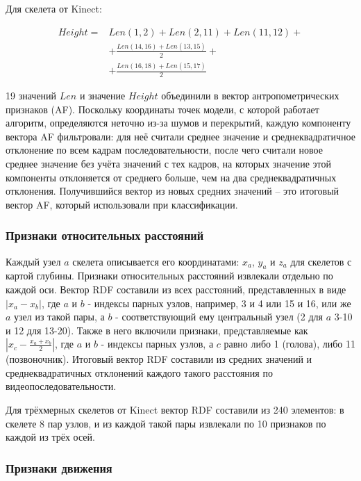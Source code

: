 \documentclass[a4paper,twoside,11pt]{article}
\numberwithin{equation}{section}
\begin{document}
Для скелета от Kinect:

\begin{align*}
 Height =& Len(1, 2) + Len(2, 11) + Len(11, 12) + \\
         &+ \frac{Len(14, 16) + Len(13, 15)}{2} + \\
         &+ \frac{Len(16, 18) + Len(15, 17)}{2}
\end{align*}

19 значений $Len$ и значение $Height$ объединили в вектор антропометрических признаков (AF). Поскольку координаты точек модели, с которой работает алгоритм, определяются неточно из-за шумов и перекрытий, каждую компоненту вектора AF фильтровали: для неё считали среднее значение и среднеквадратичное отклонение по всем кадрам последовательности, после чего считали новое среднее значение без учёта значений с тех кадров, на которых значение этой компоненты отклоняется от среднего больше, чем на два среднеквадратичных отклонения. Получившийся вектор из новых средних значений -- это итоговый вектор AF, который использовали при классификации.

\subsubsection{Признаки относительных расстояний}

Каждый узел $a$ скелета описывается его координатами: $x_a$, $y_a$ и $z_a$ для скелетов с картой глубины.  Признаки относительных расстояний извлекали отдельно по каждой оси. Вектор RDF составили из всех расстояний, представленных в виде  $|x_a - x_b|$, где $a$ и $b$ - индексы парных узлов, например, 3 и 4 или 15 и 16, или же $a$ узел из такой пары, а  $b$ - соответствующий ему центральный узел (2 для $a$ 3-10 и 12 для 13-20). Также в него включили признаки, представляемые как $|x_c - \frac{x_a + x_b}{2}|$, где $a$ и $b$ - индексы парных узлов, а $c$ равно либо 1 (голова), либо 11 (позвоночник). Итоговый вектор RDF составили из средних значений и среднеквадратичных отклонений каждого такого расстояния по видеопоследовательности.

Для трёхмерных скелетов от Kinect вектор RDF составили из 240 элементов: в скелете 8 пар узлов, и из каждой такой пары извлекали по 10 признаков по каждой из трёх осей.

\subsubsection{Признаки движения}
\end{document}

